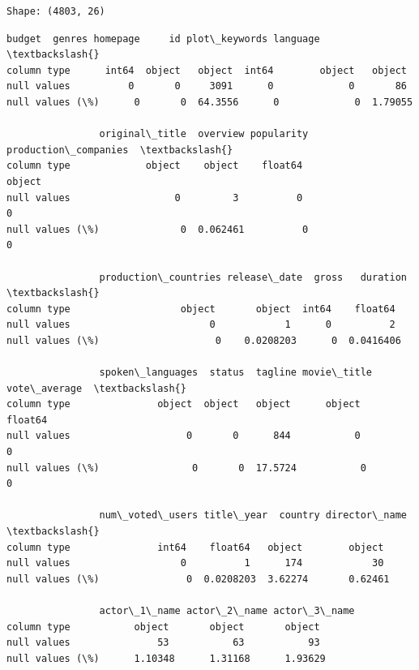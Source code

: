     \begin{Verbatim}[commandchars=\\\{\}]
Shape: (4803, 26)
\end{Verbatim}

            \begin{tcolorbox}[breakable, boxrule=.5pt, size=fbox, pad at break*=1mm, opacityfill=0]
\begin{Verbatim}[commandchars=\\\{\}]
                budget  genres homepage     id plot\_keywords language  \textbackslash{}
column type      int64  object   object  int64        object   object
null values          0       0     3091      0             0       86
null values (\%)      0       0  64.3556      0             0  1.79055

                original\_title  overview popularity production\_companies  \textbackslash{}
column type             object    object    float64               object
null values                  0         3          0                    0
null values (\%)              0  0.062461          0                    0

                production\_countries release\_date  gross   duration  \textbackslash{}
column type                   object       object  int64    float64
null values                        0            1      0          2
null values (\%)                    0    0.0208203      0  0.0416406

                spoken\_languages  status  tagline movie\_title vote\_average  \textbackslash{}
column type               object  object   object      object      float64
null values                    0       0      844           0            0
null values (\%)                0       0  17.5724           0            0

                num\_voted\_users title\_year  country director\_name  \textbackslash{}
column type               int64    float64   object        object
null values                   0          1      174            30
null values (\%)               0  0.0208203  3.62274       0.62461

                actor\_1\_name actor\_2\_name actor\_3\_name
column type           object       object       object
null values               53           63           93
null values (\%)      1.10348      1.31168      1.93629
\end{Verbatim}
\end{tcolorbox}
        

